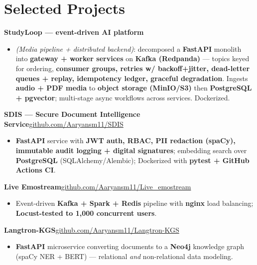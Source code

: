 \documentclass[10pt,a4paper]{article}
\begin{document}
\section*{Selected Projects}
\vspace{1pt}\textbf{StudyLoop --- event-driven AI platform}
\begin{itemize}
\item \textit{(Media pipeline + distributed backend)}: decomposed a \textbf{FastAPI} monolith into \textbf{gateway + worker services} on \textbf{Kafka (Redpanda)} --- topics keyed for ordering, \textbf{consumer groups, retries w/ backoff+jitter, dead-letter queues + replay, idempotency ledger, graceful degradation}. Ingests \textbf{audio + PDF media} to \textbf{object storage (MinIO/S3)} then \textbf{PostgreSQL + pgvector}; multi-stage async workflows across services. Dockerized.
\end{itemize}
\vspace{1pt}\textbf{SDIS --- Secure Document Intelligence Service}\hfill {\small\href{https://github.com/Aaryansm11/SDIS}{github.com/Aaryansm11/SDIS}}
\begin{itemize}
\item \textbf{FastAPI} service with \textbf{JWT auth, RBAC, PII redaction (spaCy), immutable audit logging + digital signatures}; embedding search over \textbf{PostgreSQL} (SQLAlchemy/Alembic); Dockerized with \textbf{pytest + GitHub Actions CI}.
\end{itemize}
\vspace{1pt}\textbf{Live Emostream}\hfill {\small\href{https://github.com/Aaryansm11/Live_emostream}{github.com/Aaryansm11/Live\_emostream}}
\begin{itemize}
\item Event-driven \textbf{Kafka + Spark + Redis} pipeline with \textbf{nginx} load balancing; \textbf{Locust-tested to 1,000 concurrent users}.
\end{itemize}
\vspace{1pt}\textbf{Langtron-KGS}\hfill {\small\href{https://github.com/Aaryansm11/Langtron-KGS}{github.com/Aaryansm11/Langtron-KGS}}
\begin{itemize}
\item \textbf{FastAPI} microservice converting documents to a \textbf{Neo4j} knowledge graph (spaCy NER + BERT) --- relational \textit{and} non-relational data modeling.
\end{itemize}
\end{document}
